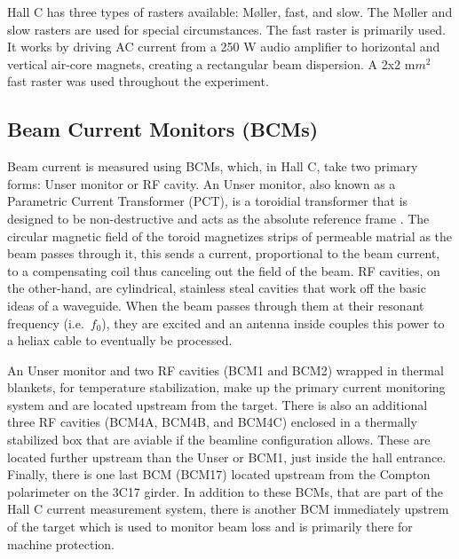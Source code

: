 \documentclass[
]{report}
\begin{document}


Hall C has three types of rasters available: \(\text{M\o{}ller}\), fast,
and slow. The \(\text{M\o{}ller}\) and slow rasters are used for special
circumstances. The fast raster is primarily used. It works by driving AC
current from a 250 W audio amplifier to horizontal and vertical air-core
magnets, creating a rectangular beam dispersion. A 2x2 m\(m^2\) fast
raster was used throughout the experiment.

\hypertarget{beam-current-monitors-bcms}{%
\subsection{Beam Current Monitors
(BCMs)}\label{beam-current-monitors-bcms}}

Beam current is measured using BCMs, which, in Hall C, take two primary
forms: Unser monitor or RF cavity. An Unser monitor, also known as a
Parametric Current Transformer (PCT), is a toroidial transformer that is
designed to be non-destructive and acts as the absolute reference frame
\cite{unser_parametric_1992}. The circular magnetic field of the toroid
magnetizes strips of permeable matrial as the beam passes through it,
this sends a current, proportional to the beam current, to a
compensating coil thus canceling out the field of the beam. RF cavities,
on the other-hand, are cylindrical, stainless steal cavities that work
off the basic ideas of a waveguide. When the beam passes through them at
their resonant frequency (i.e.~\(f_0\)), they are excited and an antenna
inside couples this power to a heliax cable to eventually be processed.

An Unser monitor and two RF cavities (BCM1 and BCM2) wrapped in thermal
blankets, for temperature stabilization, make up the primary current
monitoring system and are located upstream from the target. There is
also an additional three RF cavities (BCM4A, BCM4B, and BCM4C) enclosed
in a thermally stabilized box that are aviable if the beamline
configuration allows. These are located further upstream than the Unser
or BCM1, just inside the hall entrance. Finally, there is one last BCM
(BCM17) located upstream from the Compton polarimeter on the 3C17
girder. In addition to these BCMs, that are part of the Hall C current
measurement system, there is another BCM immediately upstrem of the
target which is used to monitor beam loss and is primarily there for
machine protection.


\end{document}
